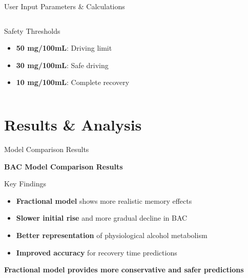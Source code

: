 \documentclass[aspectratio=169]{beamer}
\newcommand{\highlight}[1]{\textcolor{kentech_orange}{\textbf{#1}}}
\newcommand{\safety}[1]{\textcolor{safety_green}{\textbf{#1}}}
\newcommand{\warning}[1]{\textcolor{warning_red}{\textbf{#1}}}
\begin{document}
\begin{frame}{User Input Parameters \& Calculations}
\begin{columns}
\begin{column}{0.5\textwidth}
            \begin{block}{Safety Thresholds}
                \begin{itemize}
                    \item \warning{50 mg/100mL}: Driving limit
                    \item \safety{30 mg/100mL}: Safe driving
                    \item \safety{10 mg/100mL}: Complete recovery
                \end{itemize}
            \end{block}
        \end{column}
    \end{columns}
\end{frame}

\section{Results \& Analysis}

\begin{frame}{Model Comparison Results}
    \begin{center}
        \textcolor{kentech_blue}{\Large \textbf{BAC Model Comparison Results}}
    \end{center}
    
    \begin{block}{Key Findings}
        \begin{itemize}
            \item \highlight{Fractional model} shows more realistic memory effects
            \item \highlight{Slower initial rise} and more gradual decline in BAC
            \item \highlight{Better representation} of physiological alcohol metabolism
            \item \highlight{Improved accuracy} for recovery time predictions
        \end{itemize}
    \end{block}
    
    \begin{center}
        \textbf{Fractional model provides more conservative and safer predictions}
    \end{center}
\end{frame}
\end{document}
